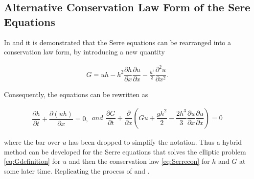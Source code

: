 \documentclass[SingleSpace,12pt]{Serre_ASCE}
\begin{document}
\subsection{Alternative Conservation Law Form of the Sere Equations}
\label{section:Alternative Conservation Law Form of the Sere Equations}
In  and  it is demonstrated that the Serre equations can be rearranged into a conservation law form, by introducing a new quantity
\begin{linenomath*}
\begin{gather}
\label{eq:Gdefinition}
G = uh - h^2 \dfrac{\partial h}{\partial x} \dfrac{\partial u}{\partial x} - \frac{h^3}{3} \dfrac{\partial^2 u}{\partial x^2}.
\end{gather}
\end{linenomath*}
Consequently, the equations can be rewritten as
\begin{linenomath*}
\begin{subequations}
\begin{gather}
\dfrac{\partial h}{\partial t} + \dfrac{\partial (uh)}{\partial x} = 0,
\label{eq:Serrecon_continuity}
\end{gather}
and
\begin{gather}
\dfrac{\partial G}{\partial t} + \dfrac{\partial}{\partial x}\left(Gu + \dfrac{gh^2}{2} - \dfrac{2h^3}{3}\dfrac{\partial u}{\partial x}\dfrac{\partial u}{\partial x}\right) = 0
\label{eq:Serrecon_momentum}
\end{gather}
\label{eq:Serrecon}
\end{subequations}
\end{linenomath*}
where the bar over $u$ has been dropped to simplify the notation. Thus a hybrid method can be developed for the Serre equations that solves the elliptic problem \eqref{eq:Gdefinition} for $u$ and then the conservation law \eqref{eq:Serrecon} for $h$ and $G$ at some later time. Replicating the process of  and .
\end{document}
